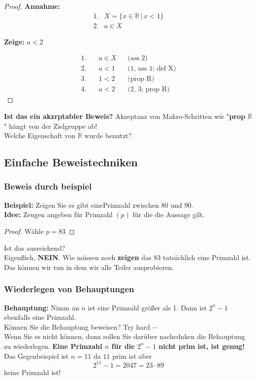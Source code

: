 \begin{proof}
    \textbf{Annahme:}
    \begin{align*}
    1. & X = \{x\in\mathbb{R} \,|\, x<1\} \\
    2. & a\in X
    \end{align*}

    \textbf{Zeige:} $a<2$

    \begin{align*}
    1. &\quad a\in X                   && \text{(ass 2)} \\
    2. &\quad a<1                      && \text{(1, ass 1; def X)} \\
    3. &\quad 1<2                      && \text{(prop R)} \\
    4. &\quad a<2                      && \text{(2, 3; prop R)}
    \end{align*}
\end{proof}
\textbf{Ist das ein akzrptabler Beweis?} Akzeptanz von Makro-Schritten wie "\textbf{prop $\mathbb{R}
$}" hängt von der Zielgruppe ab! \\ Welche Eigenschaft von $\mathbb{R}$ wurde benutzt?

\subsection{Einfache Beweistechniken}
\subsubsection*{Beweis durch beispiel}
\textbf{Beispiel: } Zeigen Sie es gibt einePrimzahl zwischen 80 und 90.\\ \textbf{Idee: } Zeugen angeben für Primzahl $(p)$ für die die Aussage gilt.
\begin{proof}
    Wähle $p = 83$
\end{proof} 
Ist das ausreichend?\\Eigenflich, \textbf{NEIN}. Wie müssen noch \textbf{zeigen} das 83 tatsächlich eine Primzahl ist. \\Das können wir tun in dem wir alle Teiler ausprobieren. 

\subsubsection*{Wiederlegen von Behauptungen} 
\textbf{Behauptung: } Nimm an $n$ ist eine Primzahl größer als 1. Dann ist $2^n - 1$ ebenfalls eine Primzahl. \\Können Sie die Behauptung beweisen? Try hard $\cdots$\\ Wenn Sie es nicht können, dann sollen Sie darüber nachednken die Behauptung zu wiederlegen. \textbf{Eine Primzahl $n$ für die $2^n - 1$ nicht prim ist, ist genug!}\\ Das Gegenbeispiel ist $n = 11$ da $11$ prim ist aber \[2^{11} - 1 = 2047 = 23 \cdot 89\] keine Primzahl ist!

